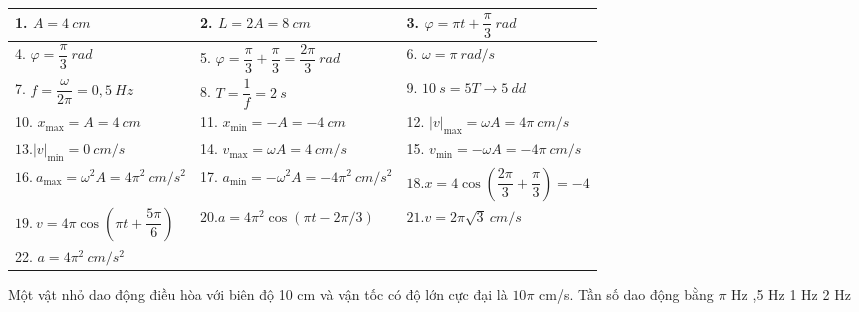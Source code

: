 \begin{vidu}
{\begin{center}
\begin{tabular}{|l|l|l|}
\hline 1. $A=4\ cm$ & 2. $L=2 A=8\ cm$ & 3. $\varphi=\pi t+\dfrac{\pi}{3}\ rad$ \\
\hline 4. $\varphi=\dfrac{\pi}{3}\ rad$ & 5. $\varphi=\dfrac{\pi}{3}+\dfrac{\pi}{3}=\dfrac{2\pi}{3}\ rad$ & 6. $\omega=\pi\ rad/s$ \\
\hline 7. $f=\dfrac{\omega}{2\pi}=0,5\ Hz$ & 8. $T=\dfrac{1}{f}=2\ s$ & 9. $10\ s=5 T \rightarrow 5\ dd$ \\
\hline 10. $x_{\max }=A=4\ cm$ & 11. $x_{\min }=-A=-4\ cm$ & 12. $|v|_{\max }=\omega A=4 \pi\ cm/s$ \\
\hline $13 .|v|_{\min }=0\ cm/s$ & 14. $v_{\max }=\omega A=4 \ cm/s$ & 15. $v_{\min }=-\omega A=-4 \pi\ cm/s$ \\
\hline $16 .\ a_{\max }=\omega^2 A=4 \pi^2\ cm/s^2$ & 17. $a_{\min }=-\omega^2 A=-4 \pi^2\ cm/s^2$ & $18 . x=4 \cos (\dfrac{2 \pi}{3}+\dfrac{\pi}{3})=-4$ \\
\hline $19 .\ v=4 \pi \cos (\pi t+\dfrac{5 \pi}{6})$ & $20 . a=4 \pi^2 \cos (\pi t-2 \pi / 3)$ & $21 . v=2 \pi \sqrt{3}\ cm/s$ \\
\hline 22. $a=4 \pi^2\ cm/s^2$ & 
 & \\
 \hline
\end{tabular}
\end{center} 
}
\end{vidu}
\begin{vidu}%
Một vật nhỏ dao động điều hòa với biên độ 10 cm và vận tốc có độ lớn cực đại là $10\pi$  cm/s. Tần số dao động bằng
\choice
{$\pi$  Hz}
{,5 Hz}
{1 Hz}
{2 Hz}
\end{vidu} 
